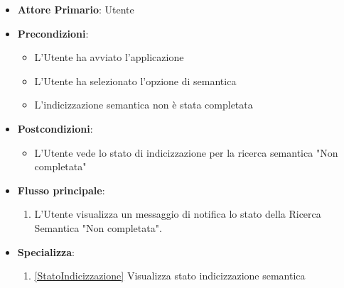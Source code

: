 \begin{itemize}
    \item \textbf{Attore Primario}: Utente
    \item \textbf{Precondizioni}:
    \begin{itemize}
      \item L'Utente ha avviato l'applicazione
      \item L'Utente ha selezionato l'opzione di  semantica
      \item L'indicizzazione semantica non è stata completata
    \end{itemize}
    \item \textbf{Postcondizioni}:
    \begin{itemize}
        \item L'Utente vede lo stato di indicizzazione per la ricerca semantica "Non completata"
    \end{itemize}
    \item \textbf{Flusso principale}:
    \begin{enumerate}
        \item L'Utente visualizza un messaggio di notifica lo stato della Ricerca Semantica "Non completata".
    \end{enumerate}
    \item \textbf{Specializza}:
    \begin{enumerate}
              \item \ref{StatoIndicizzazione} Visualizza stato indicizzazione semantica
    \end{enumerate}
\end{itemize}

